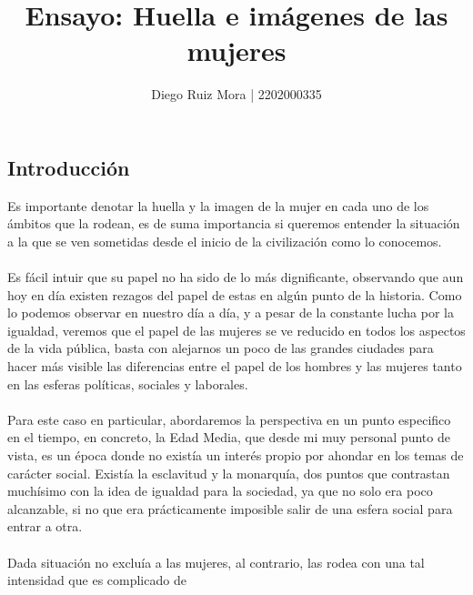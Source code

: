 \documentclass[12p]{report}
\title{Ensayo: Huella e imágenes de las mujeres}
\author{Diego Ruiz Mora | 2202000335}
\begin{document}
\maketitle
\newpage
\subsection{Introducción}
Es importante denotar la huella y la imagen de la mujer en cada uno de los ámbitos que la rodean, es de suma importancia si queremos entender la situación a la que se ven sometidas desde el inicio de la civilización como lo conocemos. 
\\\\
Es fácil intuir que su papel no ha sido de lo más dignificante, observando que aun hoy en día existen rezagos del papel de estas en algún punto de la historia. Como lo podemos observar en nuestro día a día, y a pesar de la constante lucha por la igualdad,  veremos que el papel de las mujeres se ve reducido en todos los aspectos de la vida pública, basta con alejarnos un poco de las grandes ciudades para hacer más visible las diferencias entre el papel de los hombres y las mujeres tanto en las esferas políticas, sociales y laborales. 
\\\\
Para este caso en particular, abordaremos la perspectiva en un punto especifico en el tiempo, en concreto, la Edad Media, que desde mi muy personal punto de vista, es un época donde no existía un interés propio por ahondar en los temas de carácter social. 
Existía la esclavitud y la monarquía, dos puntos que contrastan muchísimo con la idea de igualdad para la sociedad, ya que no solo era poco alcanzable, si no que era prácticamente imposible salir de una esfera social para entrar a otra. 
\\\\
Dada situación no excluía a las mujeres, al contrario, las rodea con una tal intensidad que es complicado de  
\end{document}

